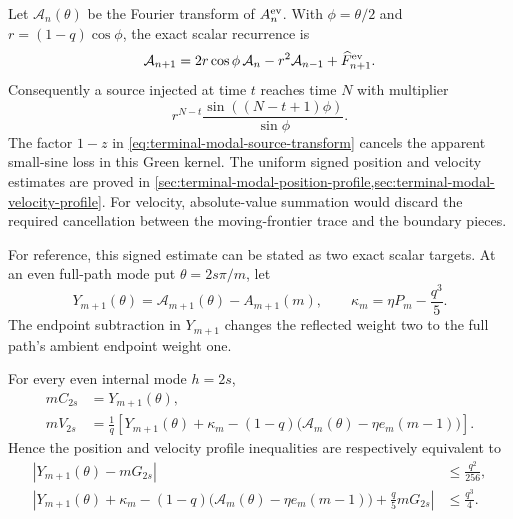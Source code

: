 Let $\mathcal A_n(\theta)$ be the Fourier transform of
$A_n^{\rm ev}$.  With $\phi=\theta/2$ and
$r=(1-q)\cos\phi$, the exact scalar recurrence is
\begin{equation}
 \mathcal A_{n+1}=2r\cos\phi\,\mathcal A_n-r^2\mathcal A_{n-1}
 +\widehat F_{n+1}^{\rm ev}.
 \label{eq:terminal-modal-driven-transform}
\end{equation}
Consequently a source injected at time $t$ reaches time $N$ with multiplier
\begin{equation}
 r^{N-t}\frac{\sin((N-t+1)\phi)}{\sin\phi}.
 \label{eq:terminal-modal-source-green}
\end{equation}
The factor $1-z$ in
\eqref{eq:terminal-modal-source-transform} cancels the apparent small-sine
loss in this Green kernel.  The uniform signed position and velocity estimates
are proved in
\cref{sec:terminal-modal-position-profile,sec:terminal-modal-velocity-profile}.
For velocity, absolute-value summation would discard the required cancellation
between the moving-frontier trace and the boundary pieces.

For reference, this signed estimate can be stated as two exact scalar
targets.  At an even full-path mode put
$\theta=2s\pi/m$, let
\begin{equation}
 Y_{m+1}(\theta)
 =\mathcal A_{m+1}(\theta)-A_{m+1}(m),
 \qquad
 \kappa_m=\eta P_m-\frac{q^3}{5}.
 \label{eq:terminal-modal-source-scalar-data}
\end{equation}
The endpoint subtraction in $Y_{m+1}$ changes the reflected weight two to
the full path's ambient endpoint weight one.

\begin{lemma}
\label{lem:terminal-modal-source-scalar-reduction}
For every even internal mode $h=2s$,
\begin{align}
 mC_{2s}&=Y_{m+1}(\theta),
 \label{eq:terminal-modal-source-position-scalar}\\
 mV_{2s}&=\frac1q\left[
 Y_{m+1}(\theta)+\kappa_m
 -(1-q)\bigl(\mathcal A_m(\theta)-\eta e_m(m-1)\bigr)
 \right].
 \label{eq:terminal-modal-source-velocity-scalar}
\end{align}
Hence the position and velocity profile inequalities are respectively
equivalent to
\begin{align}
 \left|Y_{m+1}(\theta)-mG_{2s}\right|&\le\frac{q^2}{256},
 \label{eq:terminal-modal-source-position-target}\\
 \left|Y_{m+1}(\theta)+\kappa_m
 -(1-q)\bigl(\mathcal A_m(\theta)-\eta e_m(m-1)\bigr)
 +\frac q5mG_{2s}\right|&\le\frac{q^3}{4}.
 \label{eq:terminal-modal-source-velocity-target}
\end{align}
\end{lemma}

